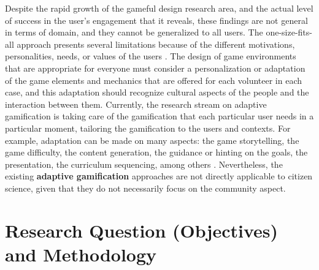 \documentclass[sigconf]{acmart}
\begin{document}



Despite the rapid growth of the gameful design research area, and the actual level of success in the user’s engagement that it reveals, these findings are not general in terms of domain, and they cannot be generalized to all users. The one-size-fits-all approach presents several limitations because of the different motivations, personalities, needs, or values of the users \cite{bockle_towards_2017,Heeter2011}. The design of game environments that are appropriate for everyone must consider a personalization or adaptation of the game elements and mechanics that are offered  for each volunteer in each case, and this adaptation should recognize cultural aspects of the people and the interaction between them. Currently, the research stream on adaptive gamification is taking care of the gamification that each particular user needs in a particular moment, tailoring the gamification to the users and contexts\cite{orji2018,klock2015gamification}. For example, adaptation can be made on many aspects: the game storytelling, the game difficulty, the content generation, the guidance or hinting on the goals, the presentation, the curriculum sequencing, among others \cite{gobel_personalization_2016}. Nevertheless, the existing \textbf{adaptive gamification} approaches are not directly applicable to citizen science, given that they do not necessarily focus on the community aspect.

\section{Research Question (Objectives) and Methodology}

\end{document}
